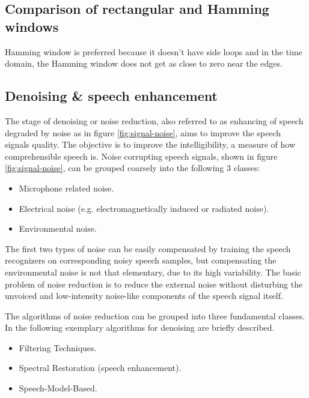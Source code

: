 \documentclass[12pt, a4paper, twoside]{report}
\begin{document}
\subsection{Comparison of rectangular and Hamming windows}
Hamming window is preferred because it doesn't have side loops and in the time domain, the Hamming window does not get as close to zero near the edges.

\subsection{Denoising \& speech enhancement}
The stage of denoising or noise reduction, also referred to as enhancing of speech degraded by noise as in figure \ref{fig:signal-noise}, aims to improve the speech signals quality. The objective is to improve the intelligibility, a measure of how comprehensible speech is. Noise corrupting speech signals, shown in figure \ref{fig:signal-noise}, can be grouped coarsely into the following 3 classes:
\begin{itemize}[noitemsep]
\item Microphone related noise.
\item Electrical noise (e.g. electromagnetically induced or radiated noise).
\item Environmental noise.
\end{itemize}

The first two types of noise can be easily compensated by training the speech recognizers on corresponding noisy speech samples, but compensating the environmental noise is not that elementary, due to its high variability. The basic problem of noise reduction is to reduce the external noise without disturbing the unvoiced and low-intensity noise-like components of the speech signal itself.
\par
The algorithms of noise reduction can be grouped into three fundamental classes. In the following exemplary algorithms for denoising are briefly described.
\begin{itemize}[noitemsep]
\item Filtering Techniques.
\item Spectral Restoration (speech enhancement).
\item Speech-Model-Based.
\end{itemize}
\end{document}
